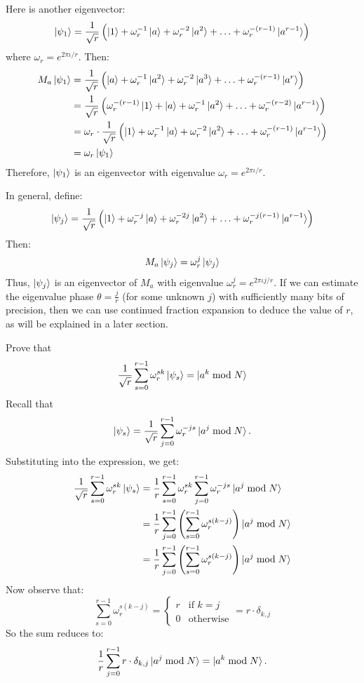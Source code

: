 Here is another eigenvector:
\[
\ket{\psi_1} = \frac{1}{\sqrt{r}} \left( \ket{1} + \omega_r^{-1} \ket{a} + \omega_r^{-2} \ket{a^2} + \ldots + \omega_r^{-(r-1)} \ket{a^{r-1}} \right)
\]
where $\omega_r = e^{2\pi \iota / r}$. Then:
\begin{align*}
    M_a \ket{\psi_1} &= \frac{1}{\sqrt{r}} \left( \ket{a} + \omega_r^{-1} \ket{a^2} + \omega_r^{-2} \ket{a^3} + \ldots + \omega_r^{-(r-1)} \ket{a^r} \right) \\
    &= \frac{1}{\sqrt{r}} \left( \omega_r^{-(r-1)} \ket{1} + \ket{a} + \omega_r^{-1} \ket{a^2} + \ldots + \omega_r^{-(r-2)} \ket{a^{r-1}} \right) \\
    &= \omega_r \cdot \frac{1}{\sqrt{r}} \left( \ket{1} + \omega_r^{-1} \ket{a} + \omega_r^{-2} \ket{a^2} + \ldots + \omega_r^{-(r-1)} \ket{a^{r-1}} \right) \\
    &= \omega_r \ket{\psi_1}
\end{align*}
Therefore, $\ket{\psi_1}$ is an eigenvector with eigenvalue $\omega_r = e^{2\pi\iota / r}$.

In general, define:
\[
\ket{\psi_j} = \frac{1}{\sqrt{r}} \left( \ket{1} + \omega_r^{-j} \ket{a} + \omega_r^{-2j} \ket{a^2} + \ldots + \omega_r^{-j(r-1)} \ket{a^{r-1}} \right)
\]
Then:
\[
M_a \ket{\psi_j} = \omega_r^j \ket{\psi_j}
\]
Thus, $\ket{\psi_j}$ is an eigenvector of $M_a$ with eigenvalue $\omega_r^j = e^{2\pi \iota j / r}$. If we can estimate the eigenvalue phase $\theta = \frac{j}{r}$ (for some unknown $j$) with sufficiently many bits of precision, then we can use continued fraction expansion to deduce the value of $r$, as will be explained in a later section.

\begin{example}
Prove that
\[
\frac{1}{\sqrt{r}} \sum_{s=0}^{r-1} \omega_r^{sk} \ket{\psi_s} = \ket{a^k \bmod N}
\]
Recall that 
\[
\ket{\psi_s} = \frac{1}{\sqrt{r}} \sum_{j=0}^{r-1} \omega_r^{-js} \ket{a^j \bmod N}.
\]
Substituting into the expression, we get:
\begin{align*}
\frac{1}{\sqrt{r}} \sum_{s=0}^{r-1} \omega_r^{sk} \ket{\psi_s}
&= \frac{1}{r} \sum_{s=0}^{r-1} \omega_r^{sk} \sum_{j=0}^{r-1} \omega_r^{-js} \ket{a^j \bmod N} \\
&= \frac{1}{r} \sum_{j=0}^{r-1} \left( \sum_{s=0}^{r-1} \omega_r^{s(k-j)} \right) \ket{a^j \bmod N} \\
&= \frac{1}{r} \sum_{j=0}^{r-1} \left( \sum_{s=0}^{r-1} \omega_r^{s(k-j)} \right) \ket{a^j \bmod N}
\end{align*}
Now observe that:
\[
\sum_{s=0}^{r-1} \omega_r^{s(k-j)} =
\begin{cases}
r & \text{if } k = j \\
0 & \text{otherwise}
\end{cases}
= r \cdot \delta_{k,j}
\]
So the sum reduces to:
\[
\frac{1}{r} \sum_{j=0}^{r-1} r \cdot \delta_{k,j} \ket{a^j \bmod N} = \ket{a^k \bmod N}.
\]
\end{example}

